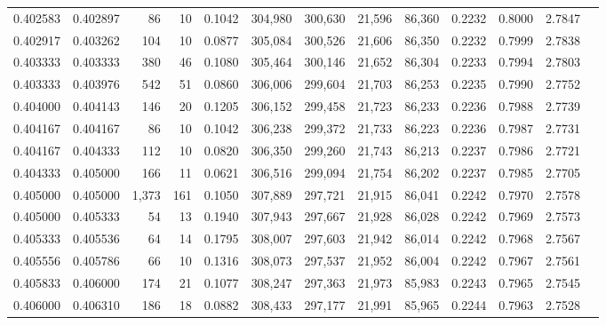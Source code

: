 \begin{tabular}{rrrrrrrrrrrrr}
0.402583 & 0.402897 &    86 &  10 &                                     0.1042 & 304,980 & 300,630 &  21,596 &  86,360 & 0.2232 & 0.8000 & 2.7847 \\
0.402917 & 0.403262 &   104 &  10 &                                     0.0877 & 305,084 & 300,526 &  21,606 &  86,350 & 0.2232 & 0.7999 & 2.7838 \\
0.403333 & 0.403333 &   380 &  46 &                                     0.1080 & 305,464 & 300,146 &  21,652 &  86,304 & 0.2233 & 0.7994 & 2.7803 \\
0.403333 & 0.403976 &   542 &  51 &                                     0.0860 & 306,006 & 299,604 &  21,703 &  86,253 & 0.2235 & 0.7990 & 2.7752 \\
0.404000 & 0.404143 &   146 &  20 &                                     0.1205 & 306,152 & 299,458 &  21,723 &  86,233 & 0.2236 & 0.7988 & 2.7739 \\
0.404167 & 0.404167 &    86 &  10 &                                     0.1042 & 306,238 & 299,372 &  21,733 &  86,223 & 0.2236 & 0.7987 & 2.7731 \\
0.404167 & 0.404333 &   112 &  10 &                                     0.0820 & 306,350 & 299,260 &  21,743 &  86,213 & 0.2237 & 0.7986 & 2.7721 \\
0.404333 & 0.405000 &   166 &  11 &                                     0.0621 & 306,516 & 299,094 &  21,754 &  86,202 & 0.2237 & 0.7985 & 2.7705 \\
0.405000 & 0.405000 & 1,373 & 161 &                                     0.1050 & 307,889 & 297,721 &  21,915 &  86,041 & 0.2242 & 0.7970 & 2.7578 \\
0.405000 & 0.405333 &    54 &  13 &                                     0.1940 & 307,943 & 297,667 &  21,928 &  86,028 & 0.2242 & 0.7969 & 2.7573 \\
0.405333 & 0.405536 &    64 &  14 &                                     0.1795 & 308,007 & 297,603 &  21,942 &  86,014 & 0.2242 & 0.7968 & 2.7567 \\
0.405556 & 0.405786 &    66 &  10 &                                     0.1316 & 308,073 & 297,537 &  21,952 &  86,004 & 0.2242 & 0.7967 & 2.7561 \\
0.405833 & 0.406000 &   174 &  21 &                                     0.1077 & 308,247 & 297,363 &  21,973 &  85,983 & 0.2243 & 0.7965 & 2.7545 \\
0.406000 & 0.406310 &   186 &  18 &                                     0.0882 & 308,433 & 297,177 &  21,991 &  85,965 & 0.2244 & 0.7963 & 2.7528 \\

\end{tabular}
